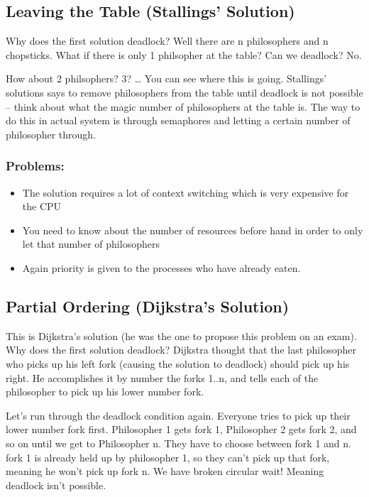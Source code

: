 \subsection{Leaving the Table (Stallings'
Solution)}\label{leaving-the-table-stallings-solution}

Why does the first solution deadlock? Well there are n philosophers and
n chopsticks. What if there is only 1 philsopher at the table? Can we
deadlock? No.

How about 2 philsophers? 3? \ldots{} You can see where this is going.
Stallings' solutions says to remove philosophers from the table until
deadlock is not possible -- think about what the magic number of
philosophers at the table is. The way to do this in actual system is
through semaphores and letting a certain number of philosopher through.

\subsubsection{Problems:}\label{problems-1}

\begin{itemize}
\tightlist
\item
  The solution requires a lot of context switching which is very
  expensive for the CPU
\item
  You need to know about the number of resources before hand in order to
  only let that number of philosophers
\item
  Again priority is given to the processes who have already eaten.
\end{itemize}

\subsection{Partial Ordering (Dijkstra's
Solution)}\label{partial-ordering-dijkstras-solution}

This is Dijkstra's solution (he was the one to propose this problem on
an exam). Why does the first solution deadlock? Dijkstra thought that
the last philosopher who picks up his left fork (causing the solution to
deadlock) should pick up his right. He accomplishes it by number the
forks 1..n, and tells each of the philosopher to pick up his lower
number fork.

Let's run through the deadlock condition again. Everyone tries to pick
up their lower number fork first. Philosopher 1 gets fork 1, Philosopher
2 gets fork 2, and so on until we get to Philosopher n. They have to
choose between fork 1 and n. fork 1 is already held up by philosopher 1,
so they can't pick up that fork, meaning he won't pick up fork n. We
have broken circular wait! Meaning deadlock isn't possible.

